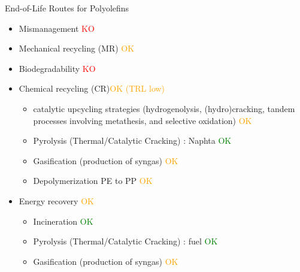 
\begin{frame}{End-of-Life Routes for Polyolefins}
    \begin{itemize}
        \item Mismanagement  \textcolor{red}{KO}
        \item Mechanical recycling (MR) \textcolor{orange}{OK}
        \item Biodegradability \textcolor{red}{KO}
        \item Chemical recycling (CR)\textcolor{orange}{OK (TRL low)}
            \begin{itemize}
                \item catalytic upcycling strategies (hydrogenolysis, (hydro)cracking, tandem processes involving metathesis, and selective oxidation) \cite{garland2024catalytic}  \textcolor{orange}{OK}
                \item Pyrolysis (Thermal/Catalytic Cracking) \cite{fraczak_chemical_2021}: Naphta \textcolor{green}{OK}
                \item Gasification (production of syngas) \textcolor{orange}{OK}
                \item Depolymerization PE to PP \textcolor{orange}{OK}
            \end{itemize}

        \item Energy recovery \textcolor{orange}{OK}
            \begin{itemize}
                \item Incineration \textcolor{green}{OK}
                \item Pyrolysis (Thermal/Catalytic Cracking) : fuel \textcolor{green}{OK}
                \item Gasification (production of syngas) \textcolor{orange}{OK}
            \end{itemize}
        
        
    \end{itemize}
\end{frame}

